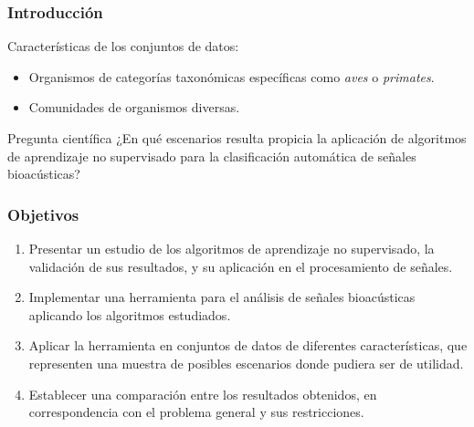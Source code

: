\begin{frame}
    \frametitle{Introducción}

    Características de los conjuntos de datos:
    \begin{itemize}
        \item Organismos de categorías taxonómicas específicas como \textit{aves} o \textit{primates}.
        \item Comunidades de organismos diversas.
    \end{itemize}

    \pause
    \begin{block}{Pregunta científica}
        ¿En qué escenarios resulta propicia la aplicación de algoritmos de aprendizaje no supervisado para la clasificación automática de señales bioacústicas?
    \end{block}
\end{frame}

\begin{frame}
    \frametitle{Objetivos}

    \begin{enumerate}
        \item<1-> Presentar un estudio de los algoritmos de aprendizaje no supervisado, la validación de sus resultados, y su aplicación en el procesamiento de señales.
        \item<2-> Implementar una herramienta para el análisis de señales bioacústicas aplicando los algoritmos estudiados.
        \item<3-> Aplicar la herramienta en conjuntos de datos de diferentes características, que representen una muestra de posibles escenarios donde pudiera ser de utilidad.
        \item<4-> Establecer una comparación entre los resultados obtenidos, en correspondencia con el problema general y sus restricciones.
    \end{enumerate}
\end{frame}